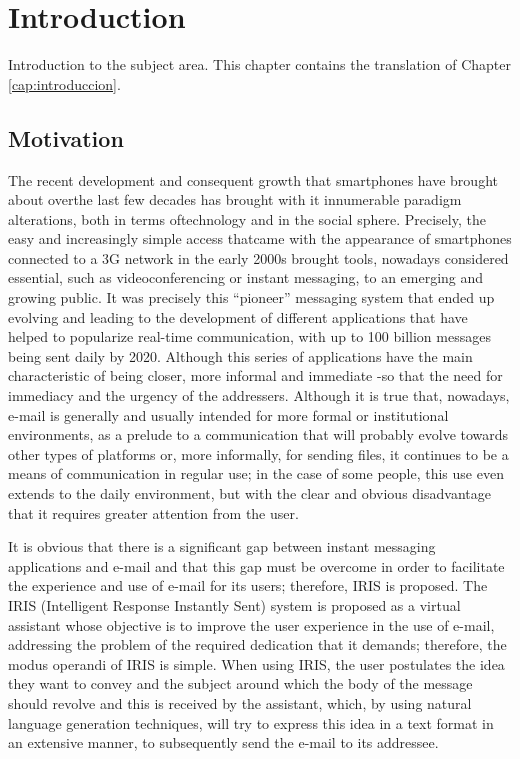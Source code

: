 \chapter{Introduction}
\label{cap:introduction}

Introduction to the subject area. This chapter contains the translation of Chapter \ref{cap:introduccion}.

\section{Motivation}
The recent development and consequent growth that smartphones have brought about overthe last few decades has brought with it innumerable paradigm alterations, both in terms oftechnology and in the social sphere. Precisely, the easy and increasingly simple access thatcame with the appearance of smartphones connected to a 3G network in the early 2000s brought tools, nowadays considered essential, such as videoconferencing or instant messaging, to an emerging and growing public. It was precisely this ``pioneer'' messaging system that ended up evolving and leading to the development of different applications that have helped to popularize real-time communication, with up to 100 billion messages being sent daily by 2020. Although this series of applications have the main characteristic of being closer, more informal and immediate -so that the need for immediacy and the urgency of the addressers. Although it is true that, nowadays, e-mail is generally and usually intended for more formal or institutional environments, as a prelude to a communication that will probably evolve towards other types of platforms or, more informally, for sending files, it continues to be a means of communication in regular use; in the case of some people, this use even extends to the daily environment, but with the clear and obvious disadvantage that it requires greater attention from the user.

It is obvious that there is a significant gap between instant messaging applications and e-mail and that this gap must be overcome in order to facilitate the experience and use of e-mail for its users; therefore, IRIS is proposed. The IRIS (Intelligent Response Instantly Sent) system is proposed as a virtual assistant whose objective is to improve the user experience in the use of e-mail, addressing the problem of the required dedication that it demands; therefore, the modus operandi of IRIS is simple. When using IRIS, the user postulates the idea they want to convey and the subject around which the body of the message should revolve and this is received by the assistant, which, by using natural language generation techniques, will try to express this idea in a text format in an extensive manner, to subsequently send the e-mail to its addressee.










